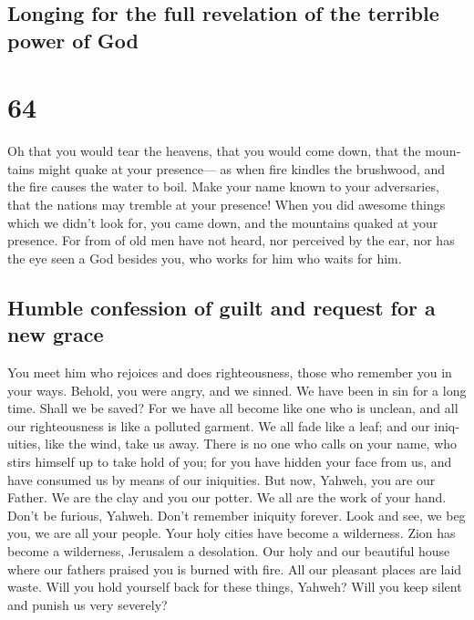 \begin{paracol}{2}
\switchcolumn
\begin{otherlanguage}{english}

\hypertarget{longing-for-the-full-revelation-of-the-terrible-power-of-god}{%
\subsection{Longing for the full revelation of the terrible power of
God}\label{longing-for-the-full-revelation-of-the-terrible-power-of-god}}

\hypertarget{section-127}{%
\section{64}\label{section-127}}

 Oh that you would tear the heavens, that you would come
down, that the mountains might quake at your presence--- 
as when fire kindles the brushwood, and the fire causes the water to
boil. Make your name known to your adversaries, that the nations may
tremble at your presence!  When you did awesome things
which we didn't look for, you came down, and the mountains quaked at
your presence.  For from of old men have not heard, nor
perceived by the ear, nor has the eye seen a God besides you, who works
for him who waits for him.

\hypertarget{humble-confession-of-guilt-and-request-for-a-new-grace}{%
\subsection{Humble confession of guilt and request for a new
grace}\label{humble-confession-of-guilt-and-request-for-a-new-grace}}

 You meet him who rejoices and does righteousness, those
who remember you in your ways. Behold, you were angry, and we sinned. We
have been in sin for a long time. Shall we be saved?  For
we have all become like one who is unclean, and all our righteousness is
like a polluted garment. We all fade like a leaf; and our iniquities,
like the wind, take us away.  There is no one who calls on
your name, who stirs himself up to take hold of you; for you have hidden
your face from us, and have consumed us by means of our iniquities.
 But now, Yahweh, you are our Father. We are the clay and
you our potter. We all are the work of your hand.  Don't
be furious, Yahweh. Don't remember iniquity forever. Look and see, we
beg you, we are all your people.  Your holy cities have
become a wilderness. Zion has become a wilderness, Jerusalem a
desolation.  Our holy and our beautiful house where our
fathers praised you is burned with fire. All our pleasant places are
laid waste.  Will you hold yourself back for these
things, Yahweh? Will you keep silent and punish us very severely?


\end{otherlanguage}
\end{paracol}
